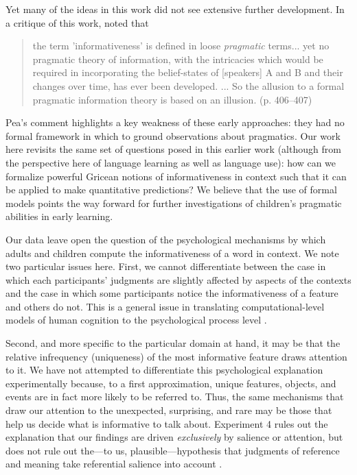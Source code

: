 \documentclass[man,noapacite]{apa2}
\begin{document}
Yet many of the ideas in this work did not see extensive further development. In a critique of this work,  noted that

\begin{quote}
the term 'informativeness' is defined in loose \emph{pragmatic} terms... yet no pragmatic theory of information, with the intricacies which would be required in incorporating the belief-states of [speakers] A and B and their changes over time, has ever been developed. ... So the allusion to a formal pragmatic information theory is based on an illusion. (p. 406--407)
\end{quote}

\noindent Pea's comment highlights a key weakness of these early approaches: they had no formal framework in which to ground observations about pragmatics. Our work here revisits the same set of questions posed in this earlier work (although from the perspective here of language learning as well as language use): how can we formalize powerful Gricean notions of informativeness in context such that it can be applied to make quantitative predictions? We believe that the use of formal models points the way forward for further investigations of children's pragmatic abilities in early learning.


Our data leave open the question of the psychological mechanisms by which adults and children compute the informativeness of a word in context. We note two particular issues here. First, we cannot differentiate between the case in which each participants' judgments are slightly affected by aspects of the contexts and the case in which some participants notice the informativeness of a feature and others do not. This is a general issue in translating computational-level models of human cognition to the psychological process level \cite{frankinpressb}. 

Second, and more specific to the particular domain at hand, it may be that the relative infrequency (uniqueness) of the most informative feature draws attention to it. We have not attempted to differentiate this psychological explanation experimentally because, to a first approximation, unique features, objects, and events are in fact more likely to be referred to. Thus, the same mechanisms that draw our attention to the unexpected, surprising, and rare may be those that help us decide what is informative to talk about. Experiment 4 rules out the explanation that our findings are driven {\em exclusively} by salience or attention, but does not rule out the---to us, plausible---hypothesis that judgments of reference and meaning take referential salience into account \cite{frank2012}.
\end{document}
